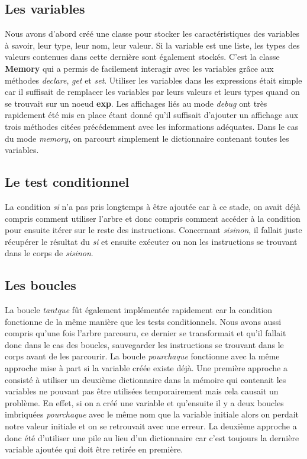 \subsection{Les variables}
Nous avons d'abord créé une classe pour stocker les caractéristiques des variables à savoir, leur type, leur nom, leur valeur.
Si la variable est une liste, les types des valeurs contenues dans cette dernière sont également stockés.
C'est la classe \textbf{Memory} qui a permis de facilement interagir avec les variables grâce aux méthodes \textit{declare}, \textit{get} et \textit{set}.
Utiliser les variables dans les expressions était simple car il suffisait de remplacer les variables par leurs valeurs et leurs types
quand on se trouvait sur un noeud \textbf{exp}.
Les affichages liés au mode \textit{debug} ont très rapidement été mis en place étant donné qu'il suffisait d'ajouter
un affichage aux trois méthodes citées précédemment avec les informations adéquates.
Dans le cas du mode \textit{memory}, on parcourt simplement le dictionnaire contenant toutes les variables.

\subsection{Le test conditionnel}
La condition \textit{si} n'a pas pris longtemps à être ajoutée car à ce stade, on avait déjà compris comment utiliser l'arbre et
donc compris comment accéder à la condition pour ensuite itérer sur le reste des instructions. 
Concernant \textit{sisinon}, il fallait juste récupérer le résultat du \textit{si} et ensuite exécuter ou non
les instructions se trouvant dans le corps de \textit{sisinon}.

\subsection{Les boucles}
La boucle \textit{tantque} fût également implémentée rapidement car la condition fonctionne de la même manière que les tests conditionnels.
Nous avons aussi compris qu'une fois l'arbre parcouru, ce dernier se transformait et qu'il fallait donc dans le cas des boucles,
sauvegarder les instructions se trouvant dans le corps avant de les parcourir.
La boucle \textit{pourchaque} fonctionne avec la même approche mise à part si la variable créée existe déjà.
Une première approche a consisté à utiliser un deuxième dictionnaire dans la mémoire qui contenait les variables ne pouvant pas être utilisées temporairement
mais cela causait un problème.
En effet, si on a créé une variable et qu'ensuite il y a deux boucles imbriquées \textit{pourchaque} avec le même nom que la variable initiale
alors on perdait notre valeur initiale et on se retrouvait avec une erreur.
La deuxième approche a donc été d'utiliser une pile au lieu d'un dictionnaire car c'est toujours la dernière variable ajoutée qui doit être retirée en première.


